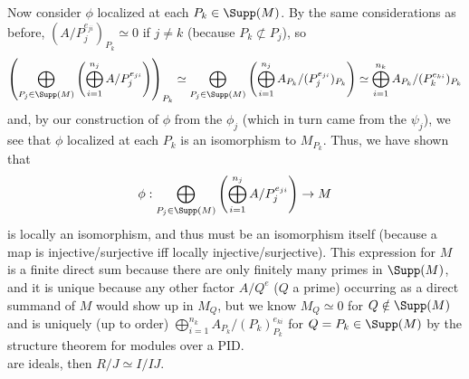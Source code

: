 \documentclass[11pt]{article}
\begin{document}
Now consider $\phi$ localized at each $P_k\in\Supp(M)$. By the same
considerations as before, $(A/P_j^{e_{ji}})_{P_k}\simeq0$ if $j\neq k$
(because $P_k\not\subset P_j$), so
\[\left(\bigoplus_{P_j\in\Supp(M)}\left(\bigoplus_{i=1}^{n_j}
A/P_j^{e_{ji}}\right)\right)_{P_k}\simeq\bigoplus_{P_j\in\Supp(M)}\left(\bigoplus_{i=1}^{n_j}
A_{P_k}/(P_j^{e_{ji}})_{P_k}\right)\simeq\bigoplus_{i=1}^{n_k}
A_{P_k}/(P_k^{e_{ki}})_{P_k} \]
and, by our construction of $\phi$ from the $\phi_j$ (which in turn came from
the $\psi_j$), we see that $\phi$ localized at each $P_k$ is an isomorphism
to $M_{P_k}$. Thus, we have shown that
\[\phi:\bigoplus_{P_j\in\Supp(M)}\left(\bigoplus_{i=1}^{n_j}
A/P_j^{e_{ji}}\right)\rightarrow M\]
is locally an isomorphism, and thus must be an isomorphism itself (because
a map is injective/surjective iff locally injective/surjective). This
expression for $M$ is a finite direct sum because there are only finitely
many primes in $\Supp(M)$, and it is unique because any other factor $A/Q^e$
($Q$ a prime) occurring as a direct summand of $M$ would show up in $M_Q$,
but we know $M_Q\simeq0$ for $Q\notin \Supp(M)$ and is uniquely (up to order)
$\bigoplus_{i=1}^{n_k} A_{P_k}/(P_k)_{P_k}^{e_{ki}}$ for $Q=P_k\in\Supp(M)$
by the structure theorem for modules over a PID. \\

%
are ideals, then $R/J\simeq I/IJ$.
\end{document}
